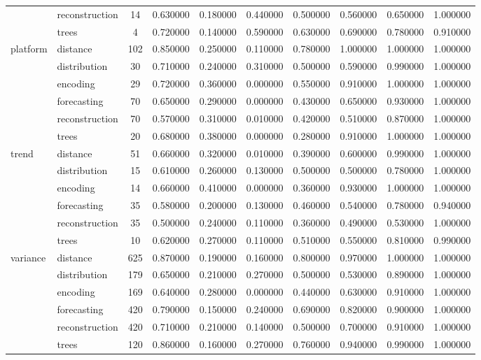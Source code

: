 \begin{tabular}{|l|l|c|c|c|c|c|c|c|c|}
 & reconstruction & 14 & 0.630000 & 0.180000 & 0.440000 & 0.500000 & 0.560000 & 0.650000 & 1.000000 \\
 & trees & 4 & 0.720000 & 0.140000 & 0.590000 & 0.630000 & 0.690000 & 0.780000 & 0.910000 \\
\cline{1-10}
\multirow[t]{6}{*}{platform} & distance & 102 & 0.850000 & 0.250000 & 0.110000 & 0.780000 & 1.000000 & 1.000000 & 1.000000 \\
 & distribution & 30 & 0.710000 & 0.240000 & 0.310000 & 0.500000 & 0.590000 & 0.990000 & 1.000000 \\
 & encoding & 29 & 0.720000 & 0.360000 & 0.000000 & 0.550000 & 0.910000 & 1.000000 & 1.000000 \\
 & forecasting & 70 & 0.650000 & 0.290000 & 0.000000 & 0.430000 & 0.650000 & 0.930000 & 1.000000 \\
 & reconstruction & 70 & 0.570000 & 0.310000 & 0.010000 & 0.420000 & 0.510000 & 0.870000 & 1.000000 \\
 & trees & 20 & 0.680000 & 0.380000 & 0.000000 & 0.280000 & 0.910000 & 1.000000 & 1.000000 \\
\cline{1-10}
\multirow[t]{6}{*}{trend} & distance & 51 & 0.660000 & 0.320000 & 0.010000 & 0.390000 & 0.600000 & 0.990000 & 1.000000 \\
 & distribution & 15 & 0.610000 & 0.260000 & 0.130000 & 0.500000 & 0.500000 & 0.780000 & 1.000000 \\
 & encoding & 14 & 0.660000 & 0.410000 & 0.000000 & 0.360000 & 0.930000 & 1.000000 & 1.000000 \\
 & forecasting & 35 & 0.580000 & 0.200000 & 0.130000 & 0.460000 & 0.540000 & 0.780000 & 0.940000 \\
 & reconstruction & 35 & 0.500000 & 0.240000 & 0.110000 & 0.360000 & 0.490000 & 0.530000 & 1.000000 \\
 & trees & 10 & 0.620000 & 0.270000 & 0.110000 & 0.510000 & 0.550000 & 0.810000 & 0.990000 \\
\cline{1-10}
\multirow[t]{6}{*}{variance} & distance & 625 & 0.870000 & 0.190000 & 0.160000 & 0.800000 & 0.970000 & 1.000000 & 1.000000 \\
 & distribution & 179 & 0.650000 & 0.210000 & 0.270000 & 0.500000 & 0.530000 & 0.890000 & 1.000000 \\
 & encoding & 169 & 0.640000 & 0.280000 & 0.000000 & 0.440000 & 0.630000 & 0.910000 & 1.000000 \\
 & forecasting & 420 & 0.790000 & 0.150000 & 0.240000 & 0.690000 & 0.820000 & 0.900000 & 1.000000 \\
 & reconstruction & 420 & 0.710000 & 0.210000 & 0.140000 & 0.500000 & 0.700000 & 0.910000 & 1.000000 \\
 & trees & 120 & 0.860000 & 0.160000 & 0.270000 & 0.760000 & 0.940000 & 0.990000 & 1.000000 \\
\cline{1-10}
\bottomrule
\end{tabular}
